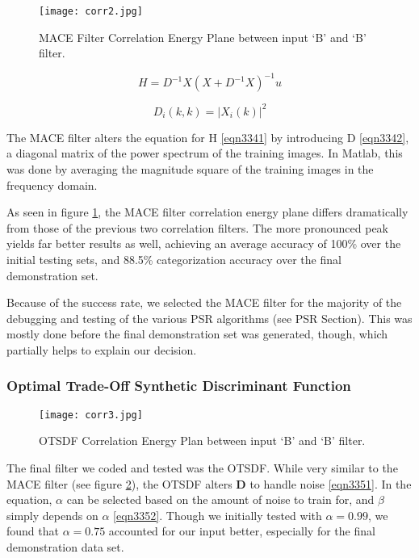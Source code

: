 \begin{figure}[h]
		\texttt{[image: corr2.jpg]}\\
		\caption{MACE Filter Correlation Energy Plane between input ‘B’ and ‘B’ filter.}
		\label{fig:corr2}
\end{figure}

\begin{equation}
\label{eqn3341}
H = D^{-1}X(X+D^{-1}X)^{-1} u
\end{equation}

\begin{equation}
\label{eqn3342}
D_{i}(k, k) = |X_{i}(k)|^{2}
\end{equation}

The MACE filter alters the equation for H \eqref{eqn3341} by introducing D \eqref{eqn3342}, 
a diagonal matrix of the power spectrum of the training images. In Matlab, this was done 
by averaging the magnitude square of the training images in the frequency domain.

As seen in figure \ref{fig:corr2}, the MACE filter correlation energy plane differs 
dramatically from those of the previous two correlation filters. The more 
pronounced peak yields far better results as well, achieving an average accuracy 
of 100\% over the initial testing sets, and 88.5\% categorization accuracy over the 
final demonstration set.

Because of the success rate, we selected the MACE filter for 
the majority of the debugging and testing of the various PSR 
algorithms (see PSR Section). This was mostly done before the 
final demonstration set was generated, though, which partially 
helps to explain our decision.

\subsubsection{Optimal Trade-Off Synthetic Discriminant Function}
\begin{figure}[h]
		\texttt{[image: corr3.jpg]}\\
		\caption{OTSDF Correlation Energy Plan between input ‘B’ and ‘B’ filter.}
		\label{fig:corr3}
\end{figure}
The final filter we coded and tested was the OTSDF. 
While very similar to the MACE filter (see figure \ref{fig:corr3}), 
the OTSDF alters \textbf{D} to handle noise \eqref{eqn3351}. In the equation, $\alpha$ 
can be selected based on the amount of noise to train for, and $\beta$ simply 
depends on $\alpha$ \eqref{eqn3352}. Though we initially tested with $\alpha = 0.99$, we 
found that $\alpha = 0.75$ accounted for our input better, especially for the final 
demonstration data set.

